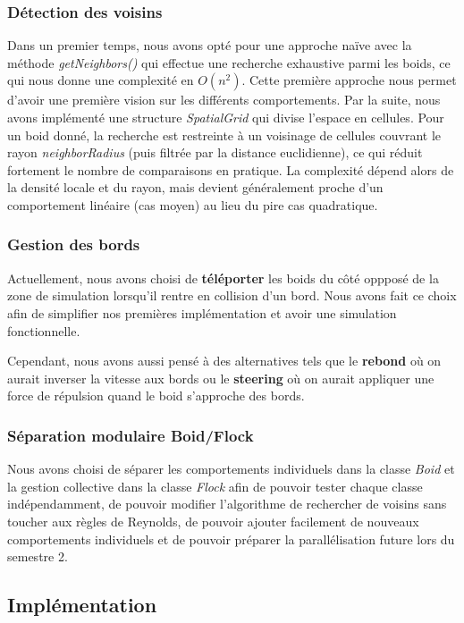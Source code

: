 \documentclass[11pt,a4paper]{article}
\begin{document}
\subsubsection{Détection des voisins}
Dans un premier temps, nous avons opté pour une approche naïve avec la méthode \textit{getNeighbors()} qui effectue une recherche exhaustive parmi les boids, ce qui nous donne une complexité en $O(n^{2})$. Cette première approche nous permet d'avoir une première vision sur les différents comportements.
Par la suite, nous avons implémenté une structure \textit{SpatialGrid} qui divise l'espace en cellules. Pour un boid donné, la recherche est restreinte à un voisinage de cellules couvrant le rayon \textit{neighborRadius} (puis filtrée par la distance euclidienne), ce qui réduit fortement le nombre de comparaisons en pratique. La complexité dépend alors de la densité locale et du rayon, mais devient généralement proche d'un comportement linéaire (cas moyen) au lieu du pire cas quadratique.

\subsubsection{Gestion des bords}
Actuellement, nous avons choisi de \textbf{téléporter} les boids du côté oppposé de la zone de simulation lorsqu'il rentre en collision d'un bord. Nous avons fait ce choix afin de simplifier nos premières implémentation et avoir une simulation fonctionnelle.

Cependant, nous avons aussi pensé à des alternatives tels que le \textbf{rebond} où on aurait inverser la vitesse aux bords ou le \textbf{steering} où on aurait appliquer une force de répulsion quand le boid s'approche des bords.

\subsubsection{Séparation modulaire Boid/Flock}
Nous avons choisi de séparer les comportements individuels dans la classe \textit{Boid} et la gestion collective dans la classe \textit{Flock} afin de pouvoir tester chaque classe indépendamment, de pouvoir modifier l'algorithme de rechercher de voisins sans toucher aux règles de Reynolds, de pouvoir ajouter facilement de nouveaux comportements individuels et de pouvoir préparer la parallélisation future lors du semestre 2.

\subsection{Implémentation}
\end{document}

